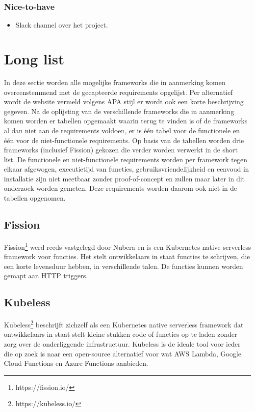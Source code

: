 \subsubsection{Nice-to-have}
\begin{itemize}
    \item Slack channel over het project.
\end{itemize}

\section{Long list}
In deze sectie worden alle mogelijke frameworks die in aanmerking komen overeenstemmend met de gecapteerde requirements opgelijst. Per alternatief wordt de website vermeld volgens APA stijl er wordt ook een korte beschrijving gegeven. Na de oplijsting van de verschillende frameworks die in aanmerking komen worden er tabellen opgemaakt waarin terug te vinden is of de frameworks al dan niet aan de requirements voldoen, er is één tabel voor de functionele en één voor de niet-functionele requirements. Op basis van de tabellen worden drie frameworks (inclusief Fission) gekozen die verder worden verwerkt in de short list. De functionele en niet-functionele requirements worden per framework tegen elkaar afgewogen, executietijd van functies, gebruiksvriendelijkheid en eenvoud in installatie zijn niet meetbaar zonder proof-of-concept en zullen maar later in dit onderzoek worden gemeten. Deze requirements worden daarom ook niet in de tabellen opgenomen.

\subsection{Fission}
Fission\footnote{https://fission.io/} werd reeds vastgelegd door Nubera en is een Kubernetes native serverless framework voor functies. Het stelt ontwikkelaars in staat functies te schrijven, die een korte levensduur hebben, in verschillende talen. De functies kunnen worden gemapt aan HTTP triggers.

\subsection{Kubeless}
Kubeless\footnote{https://kubeless.io/} beschrijft zichzelf als een Kubernetes native serverless framework dat ontwikkelaars in staat stelt kleine stukken code of functies op te laden zonder zorg over de onderliggende infrastructuur. Kubeless is de ideale tool voor ieder die op zoek is naar een open-source alternatief voor wat AWS Lambda, Google Cloud Functions en Azure Functions aanbieden.

